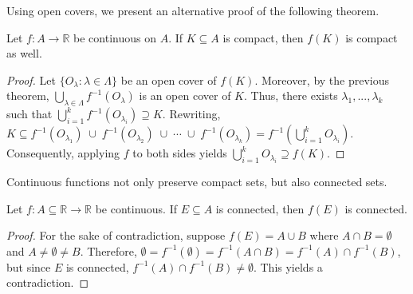 \documentclass{ximera}
\begin{document}
Using open covers, we present an alternative proof of the following theorem.

\begin{theorem}
    Let $f:A \to \mathbb{R}$ be continuous on $A$.  If $K\subseteq A$ is compact, then $f(K)$ is compact as well.  
\end{theorem}
\begin{proof}
    Let $\{O_\lambda:\lambda \in \Lambda\}$ be an open cover of $f(K)$.  Moreover, by the previous theorem, $\bigcup\limits_{\lambda \in \Lambda} f^{-1}(O_\lambda)$ is an open cover of $K$.  Thus, there exists $\lambda_1, ..., \lambda_k$ such that $\bigcup\limits_{i=1}^k f^{-1}(O_{\lambda_i}) \supseteq K$.  Rewriting, $K \subseteq f^{-1}(O_{\lambda_1})\;  \cup \; f^{-1}(O_{\lambda_2})  \; \cup \; \cdots \; \cup \; f^{-1}(O_{\lambda_k}) = f^{-1}\left(\bigcup\limits_{i=1}^k O_{\lambda_i}\right)$.  Consequently, applying $f$ to both sides yields $\bigcup\limits_{i=1}^k O_{\lambda_i} \supseteq f(K)$.
\end{proof}

Continuous functions not only preserve compact sets, but also connected sets.

\begin{theorem}
    Let $f: A\subseteq \mathbb{R}\to \mathbb{R}$ be continuous.  If $E\subseteq A$ is connected, then $f(E)$ is connected.
\end{theorem}
\begin{proof}
    For the sake of contradiction, suppose $f(E) = A\cup B$ where $A\cap B = \emptyset$ and $A\neq\emptyset\neq B$. Therefore, $\emptyset = f^{-1}(\emptyset) = f^{-1}(A\cap B) = f^{-1}(A) \cap f^{-1}(B)$, but since $E$ is connected, $f^{-1}(A) \cap f^{-1}(B) \neq \emptyset$.  This yields a contradiction.
\end{proof}



\end{document}
